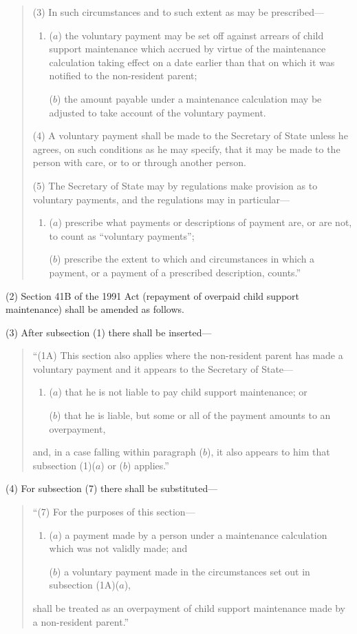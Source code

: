 \documentclass[12pt,a4paper]{article}
\begin{document}
\begin{quotation}
(3) In such circumstances and to such extent as may be prescribed—
\begin{enumerate}\item[]
($a$) the voluntary payment may be set off against arrears of child support maintenance which accrued by virtue of the maintenance calculation taking effect on a date earlier than that on which it was notified to the non-resident parent;

($b$) the amount payable under a maintenance calculation may be adjusted to take account of the voluntary payment.
\end{enumerate}

(4) A voluntary payment shall be made to the Secretary of State unless he agrees, on such conditions as he may specify, that it may be made to the person with care, or to or through another person.

(5) The Secretary of State may by regulations make provision as to voluntary payments, and the regulations may in particular—
\begin{enumerate}\item[]
($a$) prescribe what payments or descriptions of payment are, or are not, to count as “voluntary payments”;

($b$) prescribe the extent to which and circumstances in which a payment, or a payment of a prescribed description, counts.”
\end{enumerate}
\end{quotation}

(2) Section 41B of the 1991 Act (repayment of overpaid child support maintenance) shall be amended as follows.

(3) After subsection (1)  there shall be inserted—
\begin{quotation}
“(1A) This section also applies where the non-resident parent has made a voluntary payment and it appears to the Secretary of State—
\begin{enumerate}\item[]
($a$) that he is not liable to pay child support maintenance; or

($b$) that he is liable, but some or all of the payment amounts to an overpayment,
\end{enumerate}
and, in a case falling within paragraph ($b$), it also appears to him that subsection (1)($a$)  or ($b$)  applies.”
\end{quotation}

(4) For subsection (7)  there shall be substituted—
\begin{quotation}
“(7) For the purposes of this section—
\begin{enumerate}\item[]
($a$) a payment made by a person under a maintenance calculation which was not validly made; and

($b$) a voluntary payment made in the circumstances set out in subsection (1A)($a$),
\end{enumerate}
shall be treated as an overpayment of child support maintenance made by a non-resident parent.”
\end{quotation}
\end{document}
